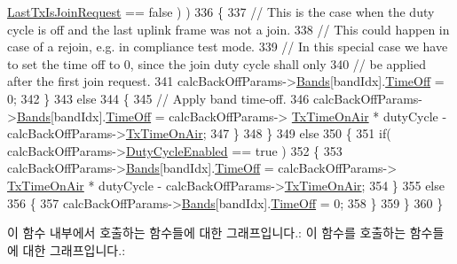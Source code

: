 \begin{DoxyCode}
      \mbox{\hyperlink{structs_region_common_calc_back_off_params_a4088d0ca2ff21fd5cdc110e14816dd53}{LastTxIsJoinRequest}} == \textcolor{keyword}{false} ) )
336         \{
337             \textcolor{comment}{// This is the case when the duty cycle is off and the last uplink frame was not a join.}
338             \textcolor{comment}{// This could happen in case of a rejoin, e.g. in compliance test mode.}
339             \textcolor{comment}{// In this special case we have to set the time off to 0, since the join duty cycle shall only}
340             \textcolor{comment}{// be applied after the first join request.}
341             calcBackOffParams->\mbox{\hyperlink{structs_region_common_calc_back_off_params_a18afce97f43b46e9d294e5babbb15f15}{Bands}}[bandIdx].\mbox{\hyperlink{structs_band_a4de67f0652eb4259907c41ea8056c318}{TimeOff}} = 0;
342         \}
343         \textcolor{keywordflow}{else}
344         \{
345             \textcolor{comment}{// Apply band time-off.}
346             calcBackOffParams->\mbox{\hyperlink{structs_region_common_calc_back_off_params_a18afce97f43b46e9d294e5babbb15f15}{Bands}}[bandIdx].\mbox{\hyperlink{structs_band_a4de67f0652eb4259907c41ea8056c318}{TimeOff}} = calcBackOffParams->
      \mbox{\hyperlink{structs_region_common_calc_back_off_params_aa17a8607485db100d315e74853dd217e}{TxTimeOnAir}} * dutyCycle - calcBackOffParams->\mbox{\hyperlink{structs_region_common_calc_back_off_params_aa17a8607485db100d315e74853dd217e}{TxTimeOnAir}};
347         \}
348     \}
349     \textcolor{keywordflow}{else}
350     \{
351         \textcolor{keywordflow}{if}( calcBackOffParams->\mbox{\hyperlink{structs_region_common_calc_back_off_params_a4d755868e0e80089462286c3ba6a6f18}{DutyCycleEnabled}} == \textcolor{keyword}{true} )
352         \{
353             calcBackOffParams->\mbox{\hyperlink{structs_region_common_calc_back_off_params_a18afce97f43b46e9d294e5babbb15f15}{Bands}}[bandIdx].\mbox{\hyperlink{structs_band_a4de67f0652eb4259907c41ea8056c318}{TimeOff}} = calcBackOffParams->
      \mbox{\hyperlink{structs_region_common_calc_back_off_params_aa17a8607485db100d315e74853dd217e}{TxTimeOnAir}} * dutyCycle - calcBackOffParams->\mbox{\hyperlink{structs_region_common_calc_back_off_params_aa17a8607485db100d315e74853dd217e}{TxTimeOnAir}};
354         \}
355         \textcolor{keywordflow}{else}
356         \{
357             calcBackOffParams->\mbox{\hyperlink{structs_region_common_calc_back_off_params_a18afce97f43b46e9d294e5babbb15f15}{Bands}}[bandIdx].\mbox{\hyperlink{structs_band_a4de67f0652eb4259907c41ea8056c318}{TimeOff}} = 0;
358         \}
359     \}
360 \}
\end{DoxyCode}
이 함수 내부에서 호출하는 함수들에 대한 그래프입니다.\+:
이 함수를 호출하는 함수들에 대한 그래프입니다.\+:
\mbox{\label{group___r_e_g_i_o_n_c_o_m_m_o_n_ga695c0ab2a06edcae5b33772f639fb676}} 
